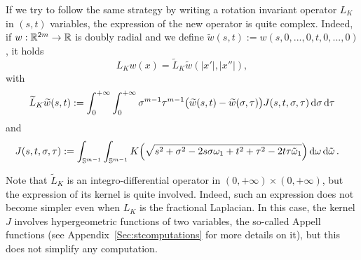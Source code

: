 %
 
 
 If we try to follow the same strategy by writing a rotation invariant operator $L_K$ in $(s,t)$ variables, the expression of the new operator is quite complex. Indeed, if $w:\mathbb{R}^{2m} \to \mathbb{R}$ is doubly radial and we define $\widetilde{w}(s,t) := w(s,0,...,0,t,0,...,0)$, it holds
$$ L_Kw(x) = \widetilde{L}_K \widetilde{w} (|x'|,|x''|), $$
with
\begin{equation}
	\label{Eq:L_K-st}
	\widetilde{L}_K \widetilde{w} (s,t) := \int_0^{+\infty}  \int_0^{+\infty} \sigma^{m-1} \tau^{m-1} \big(\widetilde{w}(s,t) - \widetilde{w}(\sigma, \tau)\big) J(s,t,\sigma, \tau)  \,\mathrm{d} \sigma\,\mathrm{d} \tau
\end{equation}
and
\begin{align*}
J(s,t,\sigma, \tau) &:= \int_{\mathbb{S}^{m-1}}  \int_{\mathbb{S}^{m-1}} K\Big( \sqrt{s^2+\sigma^2- 2 s \sigma \omega_1 + t^2 + \tau^2 - 2t \tau\tilde\omega_1}\Big) \,\mathrm{d} \omega \,\mathrm{d} \tilde\omega\,.
\end{align*}

Note that $\widetilde{L}_K$ is an integro-differential operator in $(0,+\infty)\times(0,+\infty)$, but the expression of its kernel is quite involved. Indeed, such an expression does not become simpler even when $L_K$ is the fractional Laplacian. In this case, the kernel $J$ involves hypergeometric functions of two variables, the so-called Appell functions (see Appendix~\ref{Sec:stcomputations} for more details on it), but this does not simplify any computation. 




